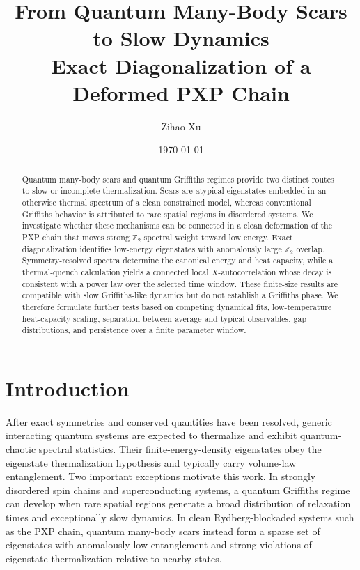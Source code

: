 \documentclass[11pt]{article}
\title{From Quantum Many-Body Scars to Slow Dynamics\\
  \large Exact Diagonalization of a Deformed PXP Chain}
\author{Zihao Xu}
\date{\today}
\newcommand{\Ztwo}{\mathbb{Z}_2}
\begin{document}
\maketitle

\begin{abstract}
Quantum many-body scars and quantum Griffiths regimes provide two distinct routes
to slow or incomplete thermalization. Scars are atypical eigenstates embedded in an
otherwise thermal spectrum of a clean constrained model, whereas conventional
Griffiths behavior is attributed to rare spatial regions in disordered systems. We
investigate whether these mechanisms can be connected in a clean deformation of the
PXP chain that moves strong $\Ztwo$ spectral weight toward low energy. Exact
diagonalization identifies low-energy eigenstates with anomalously large $\Ztwo$
overlap. Symmetry-resolved spectra determine the canonical energy and heat capacity,
while a thermal-quench calculation yields a connected local $X$-autocorrelation whose
decay is consistent with a power law over the selected time window. These finite-size
results are compatible with slow Griffiths-like dynamics but do not establish a
Griffiths phase. We therefore formulate further tests based on competing dynamical fits,
low-temperature heat-capacity scaling, separation between average and typical
observables, gap distributions, and persistence over a finite parameter window.
\end{abstract}

\section{Introduction}

After exact symmetries and conserved quantities have been resolved, generic
interacting quantum systems are expected to thermalize and exhibit quantum-chaotic
spectral statistics. Their finite-energy-density eigenstates obey the eigenstate
thermalization hypothesis and typically carry volume-law entanglement. Two important
exceptions motivate this work. In strongly disordered spin chains and superconducting
systems, a quantum Griffiths regime can develop when rare spatial regions generate a
broad distribution of relaxation times and exceptionally slow dynamics. In clean
Rydberg-blockaded systems such as the PXP chain, quantum many-body scars instead form
a sparse set of eigenstates with anomalously low entanglement and strong violations of
eigenstate thermalization relative to nearby states.
\end{document}
